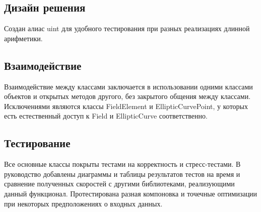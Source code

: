 \documentclass{article}
\begin{document}
\subsection{Дизайн решения}
Создан алиас uint для удобного тестирования при разных реализациях длинной арифметики.

\subsection{Взаимодействие}
Взаимодействие между классами заключается в использовании одними классами объектов и открытых методов другого, без закрытого общения между классами. Исключениями являются классы FieldElement и EllipticCurvePoint, у которых есть естественный доступ к Field и EllipticCurve соответственно.
\subsection{Тестирование}
Все основные классы покрыты тестами на корректность и стресс-тестами. В руководство добавлены диаграммы и таблицы результатов тестов на время и сравнение полученных скоростей с другими библиотеками, реализующими данный функционал. Протестирована разная компоновка и точечные оптимизации при некоторых предположениях о входных данных.
\newpage
\appendix
\end{document}

